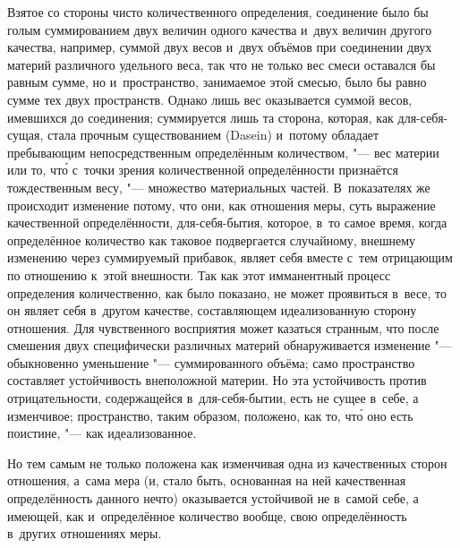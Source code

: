 Взятое со стороны чисто количественного определения, соединение было бы голым
суммированием двух величин одного качества и~двух величин другого качества,
например, суммой двух весов и~двух объёмов при соединении двух материй
различного удельного веса, так что не только вес смеси оставался бы равным
сумме, но и~пространство, занимаемое этой смесью, было бы равно сумме тех двух
пространств. Однако лишь вес оказывается суммой весов, имевшихся до соединения;
суммируется лишь та сторона, которая, как для-себя-сущая, стала прочным
существованием (Dasein) и~потому обладает пребывающим непосредственным
определённым количеством, "--- вес материи или то, чт\'{о} с~точки зрения
количественной определённости признаётся тождественным весу, "--- множество
материальных частей. В~показателях же происходит изменение потому, что они, как
отношения меры, суть выражение качественной определённости, для-себя-бытия,
которое, в~то самое время, когда определённое количество как таковое
подвергается случайному, внешнему изменению через суммируемый прибавок, являет
себя вместе с~тем отрицающим по отношению к~этой внешности. Так как этот
имманентный процесс определения количественно, как было показано, не может
проявиться в~весе, то он являет себя в~другом качестве, составляющем
идеализованную сторону отношения. Для чувственного восприятия может казаться
странным, что после смешения двух специфически различных материй обнаруживается
изменение "--- обыкновенно уменьшение "--- суммированного объёма; само
пространство составляет устойчивость внеположной материи. Но эта устойчивость
против отрицательности, содержащейся в~для-себя-бытии, есть не сущее в~себе, а
изменчивое; пространство, таким образом, положено, как то, чт\'{о} оно есть
поистине, "--- как идеализованное.

Но тем самым не только положена как изменчивая одна из качественных сторон
отношения, а~сама мера (и, стало быть, основанная на ней качественная
определённость данного нечто) оказывается устойчивой не в~самой себе, а
имеющей, как и~определённое количество вообще, свою определённость в~других
отношениях меры.


